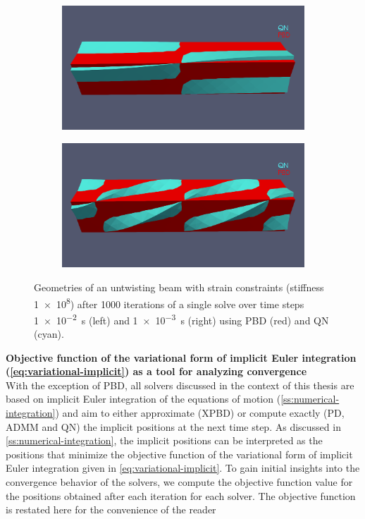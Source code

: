 \begin{figure}
    \begin{subfigure}{0.49\textwidth}
    \includegraphics[width=\textwidth, trim={0 5.0cm 0 2.5cm}, clip]{figures/strain_pbd_1e-2.png}
    \end{subfigure}
    \begin{subfigure}{0.49\textwidth}
    \includegraphics[width=\textwidth, trim={0 5.0cm 0 2.5cm}, clip]{figures/strain_pbd_1e-3.png}
    \end{subfigure}
    \caption{Geometries of an untwisting beam with strain constraints (stiffness \num{1e8}) after 1000 iterations of a single solve over time steps \SI{1e-2}{\second} (left) 
    and \SI{1e-3}{\second} (right) using PBD (red) and QN (cyan).}
    \label{fig:strain-pbd}
\end{figure}

\noindent \textbf{Objective function of the variational form of implicit Euler integration (\cref{eq:variational-implicit}) as a tool for analyzing convergence}\\
\noindent With the exception of PBD, all solvers discussed in the context of this thesis are based on implicit Euler integration of the equations of 
motion (\cref{ss:numerical-integration}) and aim to either approximate (XPBD) or compute exactly (PD, ADMM and QN) the implicit positions at the next time step. 
As discussed in \autoref{ss:numerical-integration}, the implicit positions can be interpreted as the positions that minimize the objective function of the variational 
form of implicit Euler integration given in \autoref{eq:variational-implicit}. To gain initial insights into the convergence behavior of the solvers, we compute 
the objective function value for the positions obtained after each iteration for each solver. The objective function is restated here for the convenience of the 
reader


